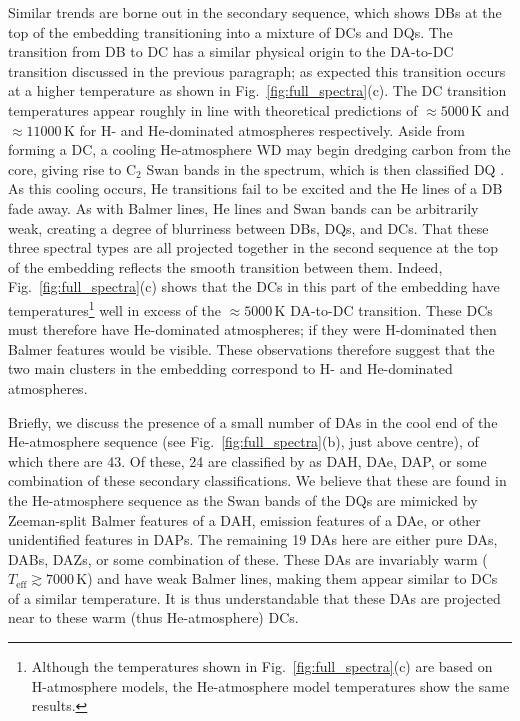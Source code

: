 \documentclass[fleqn,usenatbib]{mnras}
\def\Teff{T_\mathrm{eff}}
\begin{document}
Similar trends are borne out in the secondary sequence, which shows DBs at the top of the embedding transitioning into a mixture of DCs and DQs.
The transition from DB to DC has a similar physical origin to the DA-to-DC transition discussed in the previous paragraph; as expected this transition occurs at a higher temperature as shown in Fig.~\ref{fig:full_spectra}(c).
The DC transition temperatures appear roughly in line with theoretical predictions of $\approx 5000\,\text{K}$ and $\approx 11000\,\text{K}$ for H- and He-dominated atmospheres respectively.
Aside from forming a DC, a cooling He-atmosphere WD may begin dredging carbon from the core, giving rise to C$_2$ Swan bands in the spectrum, which is then classified DQ \citep{fontaine84}.
As this cooling occurs, He transitions fail to be excited and the He lines of a DB fade away.
As with Balmer lines, He lines and Swan bands can be arbitrarily weak, creating a degree of blurriness between DBs, DQs, and DCs.
That these three spectral types are all projected together in the second sequence at the top of the embedding reflects the smooth transition between them.
Indeed, Fig.~\ref{fig:full_spectra}(c) shows that the DCs in this part of the embedding have temperatures\footnote{
    Although the temperatures shown in Fig.~\ref{fig:full_spectra}(c) are based on H-atmosphere models, the He-atmosphere model temperatures show the same results.
} well in excess of the $\approx 5000\,\text{K}$ DA-to-DC transition.
These DCs must therefore have He-dominated atmospheres; if they were H-dominated then Balmer features would be visible.
These observations therefore suggest that the two main clusters in the embedding correspond to H- and He-dominated atmospheres.

Briefly, we discuss the presence of a small number of DAs in the cool end of the He-atmosphere sequence (see Fig.~\ref{fig:full_spectra}(b), just above centre), of which there are 43.
Of these, 24 are classified by \citet{manser24} as DAH, DAe, DAP, or some combination of these secondary classifications.
We believe that these are found in the He-atmosphere sequence as the Swan bands of the DQs are mimicked by Zeeman-split Balmer features of a DAH, emission features of a DAe, or other unidentified features in DAPs.
The remaining 19 DAs here are either pure DAs, DABs, DAZs, or some combination of these.
These DAs are invariably warm ($\Teff \gtrsim 7000\,\text{K}$) and have weak Balmer lines, making them appear similar to DCs of a similar temperature.
It is thus understandable that these DAs are projected near to these warm (thus He-atmosphere) DCs.
\end{document}
